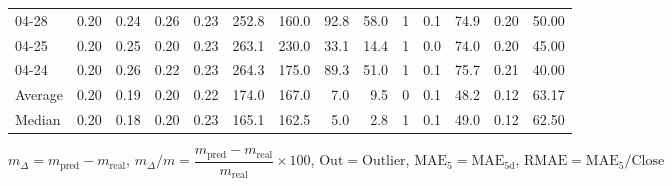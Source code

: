 \begin{threeparttable}
{\begin{tabular}{lrrrrrrrrrrrrr}
  04-28 &          0.20 &          0.24 &          0.26 &        0.23 &               252.8 &               160.0 &       92.8 &         58.0 &              1 &                 0.1 &             74.9 &            0.20 &                  50.00 \\
  04-25 &          0.20 &          0.25 &          0.20 &        0.23 &               263.1 &               230.0 &       33.1 &         14.4 &              1 &                 0.0 &             74.0 &            0.20 &                  45.00 \\
  04-24 &          0.20 &          0.26 &          0.22 &        0.23 &               264.3 &               175.0 &       89.3 &         51.0 &              1 &                 0.1 &             75.7 &            0.21 &                  40.00 \\
Average &          0.20 &          0.19 &          0.20 &        0.22 &               174.0 &               167.0 &        7.0 &          9.5 &              0 &                 0.1 &             48.2 &            0.12 &                  63.17 \\
 Median &          0.20 &          0.18 &          0.20 &        0.23 &               165.1 &               162.5 &        5.0 &          2.8 &              1 &                 0.1 &             49.0 &            0.12 &                  62.50 \\
\bottomrule
\end{tabular}
}
\begin{tablenotes}\footnotesize
\item $m_\Delta=m_{\text{pred}}-m_{\text{real}}$,
$m_\Delta/m=\dfrac{m_{\text{pred}}-m_{\text{real}}}{m_{\text{real}}}\times100$,
$\mathrm{Out}=\text{Outlier}$,
$\mathrm{MAE}_5=\mathrm{MAE}_{5\text{d}}$,
$\mathrm{RMAE}=\mathrm{MAE}_5/\text{Close}$
\end{tablenotes}
\end{threeparttable}
\endgroup

